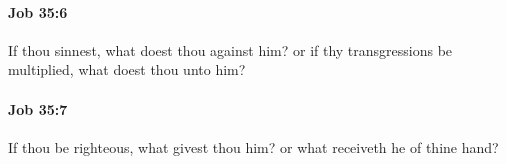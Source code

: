 		\paragraph{Job 35:6} %
			\label{JOB-35-6}

			If thou sinnest, what doest thou against him? or if thy transgressions be multiplied, what doest thou unto him?


		\paragraph{Job 35:7} %
			\label{JOB-35-7}

			If thou be righteous, what givest thou him? or what receiveth he of thine hand?


